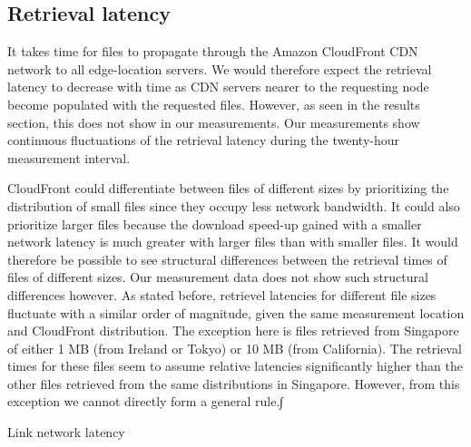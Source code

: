 \documentclass[conference]{IEEEtran}
\begin{document}
\subsection{Retrieval latency}
It takes time for files to propagate through the Amazon CloudFront CDN network to all edge-location servers. We would therefore expect the retrieval latency to decrease with time as CDN servers nearer to the requesting node become populated with the requested files. However, as seen in the results section, this does not show in our measurements. Our measurements show continuous fluctuations of the retrieval latency during the twenty-hour measurement interval.

CloudFront could differentiate between files of different sizes by prioritizing the distribution of small files since they occupy less network bandwidth. It could also prioritize larger files because the download speed-up gained with a smaller network latency is much greater with larger files than with smaller files. It would therefore be possible to see structural differences between the retrieval times of files of different sizes. Our measurement data does not show such structural differences however. As stated before, retrievel latencies for different file sizes fluctuate with a similar order of magnitude, given the same measurement location and CloudFront distribution. The exception here is files retrieved from Singapore of either 1 MB (from Ireland or Tokyo) or 10 MB (from California). The retrieval times for these files seem to assume relative latencies significantly higher than the other files retrieved from the same distributions in Singapore. However, from this exception we cannot directly form a general rule.∫



Link network latency







%
%
\end{document}
